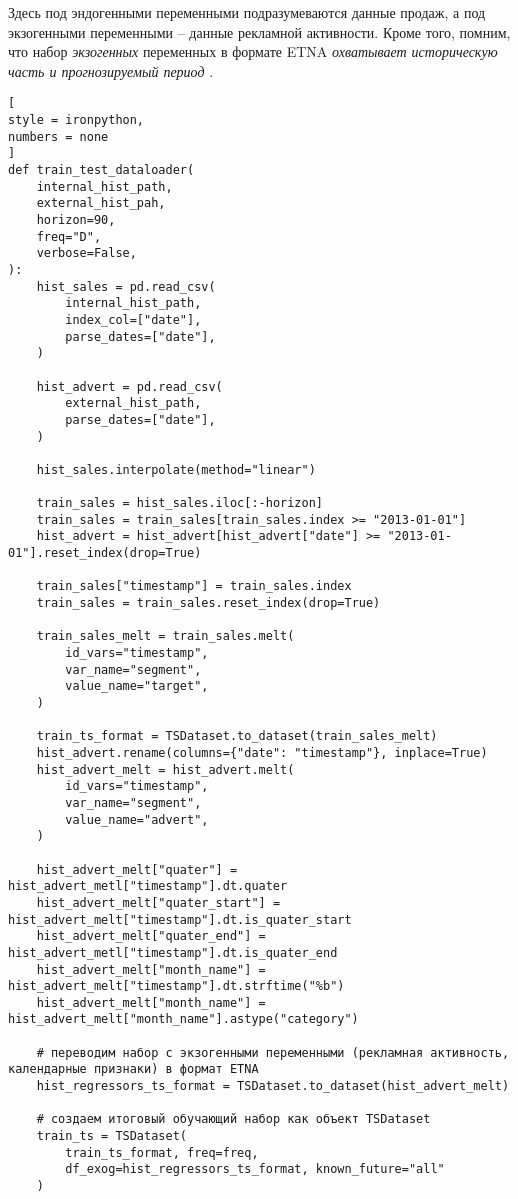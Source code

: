 \documentclass[%
	11pt,
	a4paper,
	utf8,
		]{article}
\begin{document}
Здесь под эндогенными переменными подразумеваются данные продаж, а под экзогенными переменными -- данные рекламной активности. Кроме того, помним, что набор \emph{экзогенных} переменных в формате ETNA \emph{охватывает историческую часть и прогнозируемый период} \cite[]{gruzdev:time-series-2022}.

\begin{lstlisting}[
style = ironpython,
numbers = none
]
def train_test_dataloader(
    internal_hist_path,
    external_hist_pah,
    horizon=90,
    freq="D",
    verbose=False,
):
    hist_sales = pd.read_csv(
        internal_hist_path,
        index_col=["date"],
        parse_dates=["date"],
    )
    
    hist_advert = pd.read_csv(
        external_hist_path,
        parse_dates=["date"],
    )
    
    hist_sales.interpolate(method="linear")
    
    train_sales = hist_sales.iloc[:-horizon]
    train_sales = train_sales[train_sales.index >= "2013-01-01"]
    hist_advert = hist_advert[hist_advert["date"] >= "2013-01-01"].reset_index(drop=True)
    
    train_sales["timestamp"] = train_sales.index
    train_sales = train_sales.reset_index(drop=True)
    
    train_sales_melt = train_sales.melt(
        id_vars="timestamp",
        var_name="segment",
        value_name="target",
    )
    
    train_ts_format = TSDataset.to_dataset(train_sales_melt)
    hist_advert.rename(columns={"date": "timestamp"}, inplace=True)
    hist_advert_melt = hist_advert.melt(
        id_vars="timestamp",
        var_name="segment",
        value_name="advert",
    )
    
    hist_advert_melt["quater"] = hist_advert_metl["timestamp"].dt.quater
    hist_advert_melt["quater_start"] = hist_advert_melt["timestamp"].dt.is_quater_start
    hist_advert_melt["quater_end"] = hist_advert_metl["timestamp"].dt.is_quater_end
    hist_advert_melt["month_name"] = hist_advert_melt["timestamp"].dt.strftime("%b")
    hist_advert_melt["month_name"] = hist_advert_melt["month_name"].astype("category")
    
    # переводим набор с экзогенными переменными (рекламная активность, календарные признаки) в формат ETNA
    hist_regressors_ts_format = TSDataset.to_dataset(hist_advert_melt)
    
    # создаем итоговый обучающий набор как объект TSDataset
    train_ts = TSDataset(
        train_ts_format, freq=freq,
        df_exog=hist_regressors_ts_format, known_future="all"
    )
    

\end{lstlisting}
\end{document}
